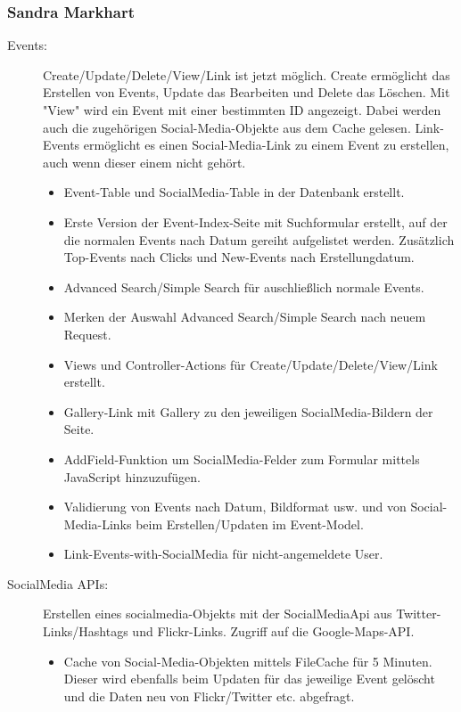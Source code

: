 \documentclass{article}
\begin{document}
\subsubsection{Sandra Markhart}

\begin{description}
    \item[Events:]
Create/Update/Delete/View/Link ist jetzt möglich. Create ermöglicht das Erstellen von Events, Update das                    Bearbeiten und Delete das Löschen. Mit "View" wird ein Event mit einer bestimmten ID angezeigt. Dabei werden auch die zugehörigen Social-Media-Objekte aus dem Cache gelesen. Link-Events ermöglicht es einen                            Social-Media-Link zu einem Event zu erstellen, auch wenn dieser einem nicht gehört. 
        \begin{itemize}
            \item Event-Table und SocialMedia-Table in der Datenbank erstellt.
            \item Erste Version der Event-Index-Seite mit Suchformular erstellt, auf der die normalen Events nach Datum gereiht aufgelistet werden. Zusätzlich Top-Events nach Clicks und New-Events nach Erstellungdatum. 
            \item Advanced Search/Simple Search für auschließlich normale Events.
            \item Merken der Auswahl Advanced Search/Simple Search nach neuem Request.
            \item Views und Controller-Actions für Create/Update/Delete/View/Link erstellt.
            \item Gallery-Link mit Gallery zu den jeweiligen SocialMedia-Bildern der Seite.
            \item AddField-Funktion um SocialMedia-Felder zum Formular mittels JavaScript hinzuzufügen.
            \item Validierung von Events nach Datum, Bildformat usw. und von Social-Media-Links beim Erstellen/Updaten im Event-Model.
            \item Link-Events-with-SocialMedia für nicht-angemeldete User.
        \end{itemize}
    \item[SocialMedia APIs:]
    Erstellen eines socialmedia-Objekts mit der SocialMediaApi aus Twitter-Links/Hashtags und Flickr-Links. Zugriff auf die Google-Maps-API.
    \begin{itemize}
            \item Cache von Social-Media-Objekten mittels FileCache für 5 Minuten. Dieser wird ebenfalls beim Updaten für               das jeweilige Event gelöscht und die Daten neu von Flickr/Twitter etc. abgefragt.

\end{itemize}
\end{description}
\end{document}
